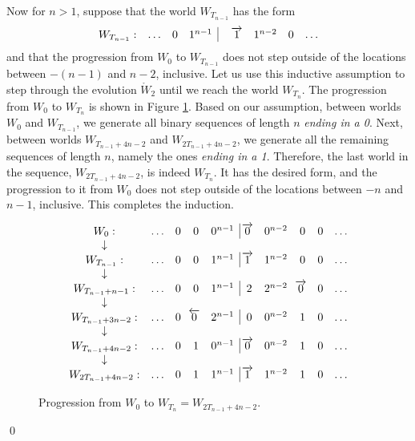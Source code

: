 \documentclass[12pt]{amsart}
\newcommand{\laa}[1]{\hspace{-0.11cm}\overleftarrow{#1}}
\newcommand{\raa}[1]{\hspace{-0.11cm}\overrightarrow{#1}}
\newcommand{\wtwo}{\mathring{W}_2}
\begin{document}
Now for $n > 1$, suppose that the world $W_{T_{n-1}}$ has the form
$$\begin{array}{cccc|ccccc}
W_{T_{n-1}}: & \ldots & 0 & 1^{n-1} & & \raa{1} & 1^{n-2} & 0 & \ldots
\end{array}$$
and that the progression from $W_0$ to $W_{T_{n-1}}$ does not step outside of the locations between $-(n-1)$ and $n-2$, inclusive. Let us use this inductive assumption to step through the evolution $\wtwo$ until we reach the world $W_{T_n}$. The progression from $W_0$ to $W_{T_n}$ is shown in Figure \ref{fig:T_n_demo}. Based on our assumption, between worlds $W_0$ and $W_{T_{n-1}}$, we generate all binary sequences of length $n$ \textit{ending in a 0}. Next, between worlds $W_{T_{n-1} + 4n - 2}$ and $W_{2T_{n-1} + 4n - 2}$, we generate all the remaining sequences of length $n$, namely the ones \textit{ending in a 1}. Therefore, the last world in the sequence, $W_{2T_{n-1} + 4n - 2}$, is indeed $W_{T_n}$. It has the desired form, and the progression to it from $W_0$ does not step outside of the locations between $-n$ and $n-1$, inclusive. This completes the induction.

\begin{figure}
$$\begin{array}{ccccc|ccccc}
W_0: & \ldots & 0 & 0 & 0^{n-1} & \raa{0} & 0^{n-2} & 0 & 0 & \ldots \\
\downarrow \\
W_{T_{n-1}}: & \ldots & 0 & 0 & 1^{n-1} & \raa{1} & 1^{n-2} & 0 & 0 & \ldots \\
\downarrow \\
W_{T_{n-1} + n - 1}: & \ldots & 0 & 0 & 1^{n-1} & 2 & 2^{n-2} & \raa{0} & 0 & \ldots \\
\downarrow \\
W_{T_{n-1} + 3n - 2}: & \ldots & 0 & \laa{0} & 2^{n-1} & 0 & 0^{n-2} & 1 & 0 & \ldots \\
\downarrow \\
W_{T_{n-1} + 4n - 2}: & \ldots & 0 & 1 & 0^{n-1} & \raa{0} & 0^{n-2} & 1 & 0 & \ldots \\
\downarrow \\
W_{2T_{n-1} + 4n - 2}: & \ldots & 0 & 1 & 1^{n-1} & \raa{1} & 1^{n-2} & 1 & 0 & \ldots \\
\end{array}$$
\caption{Progression from $W_0$ to $W_{T_n} = W_{2T_{n-1} + 4n - 2}$. \label{fig:T_n_demo}}
\end{figure}

\qed
\end{document}
